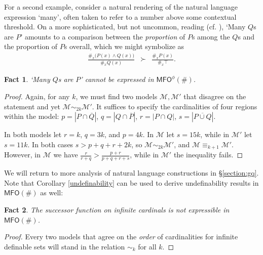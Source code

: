 \documentclass[12pt,oneside,reqno]{amsart}
\newtheorem{fact}{Fact}
\theoremstyle{definition}
\begin{document}
For a second example, consider a natural rendering of the natural language expression `many', often taken to refer to a number above some contextual threshold. On a more sophisticated, but not uncommon, reading (cf. \citealt{Westerstahl1985,Rett}), `Many $Q$s are $P$' amounts to a comparison between the \emph{proportion} of $P$s among the $Q$s and the proportion of $P$s overall, which we might symbolize as \vspace{1mm} \begin{eqnarray} \label{eq:many}
\frac{\#_x\big(P(x) \wedge Q(x)\big)}{\#_x Q(x)} & \succ & \frac{\#_x P(x)}{\#_x \top} .
\end{eqnarray}\vspace{-1mm}
\begin{fact} \emph{`Many $Q$s are $P$'} cannot be expressed in $\mathsf{MFO}^\phi(\#)$. \label{fact:many}
\end{fact}
\begin{proof} Again, for any $k$, we must find two models $\mathcal{M},\mathcal{M}'$ that disagree on the statement and yet $\mathcal{M} \sim_{2k} \mathcal{M}'$. It suffices to specify the cardinalities of four regions within the model: $p = |P \cap \overline{Q}|$, $q = |Q \cap \overline{P}|$, $r = |P \cap Q|$, $s = |\overline{P \cup Q}|$.

In both models let $r=k$, $q=3k$, and $p=4k$. In $\mathcal{M}$ let $s = 15k$, while in $\mathcal{M}'$ let $s=11k$. In both cases $s > p+q+r+2k$, so $\mathcal{M} \sim_{2k} \mathcal{M}'$, and $\mathcal{M} \equiv_{k+1} \mathcal{M}'$. However, in $\mathcal{M}$ we have $\frac{r}{r+q} > \frac{p+r}{p+q+r+s}$, while in $\mathcal{M}'$ the inequality fails. 
\end{proof}


We will return to more analysis of natural language constructions  in \S\ref{section:gq}. Note that Corollary \ref{undefinability} can be used to derive undefinability results in $\mathsf{MFO}(\#)$ as well:
\begin{fact} \label{fact:successor} The successor function on infinite cardinals is not expressible in $\mathsf{MFO}(\#)$.
\end{fact}
\begin{proof} Every two models that agree on the \emph{order} of cardinalities for infinite definable sets will stand in the relation $\sim_k$ for all $k$. 
\end{proof}
\end{document}
